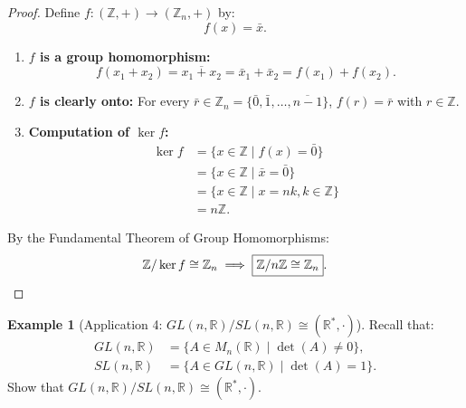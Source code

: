 \documentclass[12pt]{article}
\theoremstyle{definition}
\newtheorem{example}[definition]{Example}
\theoremstyle{plain}
\begin{document}
\begin{proof}
Define $f: (\mathbb{Z}, +) \to (\mathbb{Z}_n, +)$ by:
\[
f(x) = \bar{x}.
\]
\begin{enumerate}
    \item \textbf{$f$ is a group homomorphism:}
    \[
    f(x_1 + x_2) = \overline{x_1 + x_2} = \bar{x}_1 + \bar{x}_2 = f(x_1) + f(x_2).
    \]
    
    \item \textbf{$f$ is clearly onto:}
    For every $\bar{r} \in \mathbb{Z}_n = \{ \bar{0}, \bar{1}, \dots, \overline{n-1} \}$, $f(r) = \bar{r}$ with $r \in \mathbb{Z}$.
    
    \item \textbf{Computation of $\ker f$:}
    \begin{align*}
    \ker f &= \{ x \in \mathbb{Z} \mid f(x) = \bar{0} \} \\
    &= \{ x \in \mathbb{Z} \mid \bar{x} = \bar{0} \} \\
    &= \{ x \in \mathbb{Z} \mid x = nk, k \in \mathbb{Z} \} \\
    &= n\mathbb{Z}.
    \end{align*}
\end{enumerate}
By the Fundamental Theorem of Group Homomorphisms:
\[
\mathbb{Z}/\ker f \cong \mathbb{Z}_n \implies \boxed{\mathbb{Z}/n\mathbb{Z} \cong \mathbb{Z}_n}. \qedhere
\]
\end{proof}

\begin{example}[Application 4: $GL(n, \mathbb{R})/SL(n, \mathbb{R}) \cong (\mathbb{R}^*, \cdot)$]
Recall that:
\begin{align*}
GL(n, \mathbb{R}) &= \{ A \in M_n(\mathbb{R}) \mid \det(A) \neq 0 \}, \\
SL(n, \mathbb{R}) &= \{ A \in GL(n, \mathbb{R}) \mid \det(A) = 1 \}.
\end{align*}
Show that $GL(n, \mathbb{R})/SL(n, \mathbb{R}) \cong (\mathbb{R}^*, \cdot)$.
\end{example}
\end{document}
